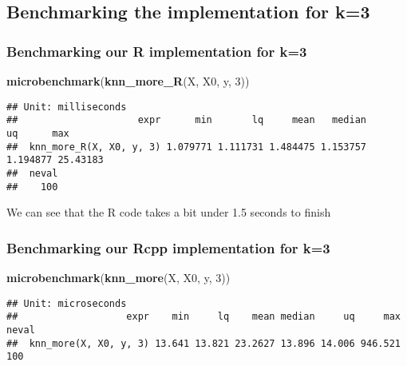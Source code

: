 \documentclass[]{article}
\newenvironment{Shaded}{\begin{snugshade}}{\end{snugshade}}
\newcommand{\DecValTok}[1]{\textcolor[rgb]{0.00,0.00,0.81}{#1}}
\newcommand{\KeywordTok}[1]{\textcolor[rgb]{0.13,0.29,0.53}{\textbf{#1}}}
\newcommand{\NormalTok}[1]{#1}
\begin{document}
\hypertarget{benchmarking-the-implementation-for-k3}{%
\subsection{Benchmarking the implementation for
k=3}\label{benchmarking-the-implementation-for-k3}}

\hypertarget{benchmarking-our-r-implementation-for-k3}{%
\subsubsection{Benchmarking our R implementation for
k=3}\label{benchmarking-our-r-implementation-for-k3}}

\begin{Shaded}
\begin{Highlighting}[]
\KeywordTok{microbenchmark}\NormalTok{(}\KeywordTok{knn_more_R}\NormalTok{(X, X0, y, }\DecValTok{3}\NormalTok{))}
\end{Highlighting}
\end{Shaded}

\begin{verbatim}
## Unit: milliseconds
##                     expr      min       lq     mean   median       uq      max
##  knn_more_R(X, X0, y, 3) 1.079771 1.111731 1.484475 1.153757 1.194877 25.43183
##  neval
##    100
\end{verbatim}

We can see that the R code takes a bit under 1.5 seconds to finish

\hypertarget{benchmarking-our-rcpp-implementation-for-k3}{%
\subsubsection{Benchmarking our Rcpp implementation for
k=3}\label{benchmarking-our-rcpp-implementation-for-k3}}

\begin{Shaded}
\begin{Highlighting}[]
\KeywordTok{microbenchmark}\NormalTok{(}\KeywordTok{knn_more}\NormalTok{(X, X0, y, }\DecValTok{3}\NormalTok{))}
\end{Highlighting}
\end{Shaded}

\begin{verbatim}
## Unit: microseconds
##                   expr    min     lq    mean median     uq     max neval
##  knn_more(X, X0, y, 3) 13.641 13.821 23.2627 13.896 14.006 946.521   100
\end{verbatim}
\end{document}
